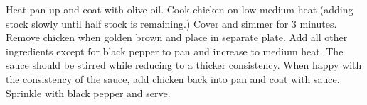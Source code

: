 \documentclass[oneside]{recipe}
\begin{document}

Heat pan up and coat with olive oil. Cook chicken on low-medium heat (adding stock slowly until half stock is remaining.) Cover and simmer for 3 minutes. Remove chicken when golden brown and place in separate plate. Add all other ingredients except for black pepper to pan and increase to medium heat. The sauce should be stirred while reducing to a thicker consistency. When happy with the consistency of the sauce, add chicken back into pan and coat with sauce. Sprinkle with black pepper and serve. 
\end{document}
